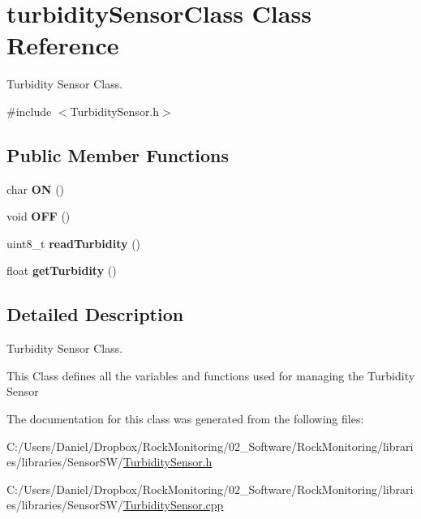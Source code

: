 \hypertarget{classturbidity_sensor_class}{}\section{turbidity\+Sensor\+Class Class Reference}
\label{classturbidity_sensor_class}


Turbidity Sensor Class.  




{\ttfamily \#include $<$Turbidity\+Sensor.\+h$>$}

\subsection*{Public Member Functions}
\begin{DoxyCompactItemize}
\item 
char {\bfseries ON} ()\hypertarget{classturbidity_sensor_class_a6c29788f29e2a5abef2773d8c6f7e779}{}\label{classturbidity_sensor_class_a6c29788f29e2a5abef2773d8c6f7e779}

\item 
void {\bfseries O\+FF} ()\hypertarget{classturbidity_sensor_class_ab3c44920d97b9f56c90e8b92b42458aa}{}\label{classturbidity_sensor_class_ab3c44920d97b9f56c90e8b92b42458aa}

\item 
uint8\+\_\+t {\bfseries read\+Turbidity} ()\hypertarget{classturbidity_sensor_class_a9b98524f56cc8042bffa4ef5348ea905}{}\label{classturbidity_sensor_class_a9b98524f56cc8042bffa4ef5348ea905}

\item 
float {\bfseries get\+Turbidity} ()\hypertarget{classturbidity_sensor_class_a467fd54cc36581815c6c0f6c69b28705}{}\label{classturbidity_sensor_class_a467fd54cc36581815c6c0f6c69b28705}

\end{DoxyCompactItemize}


\subsection{Detailed Description}
Turbidity Sensor Class. 

This Class defines all the variables and functions used for managing the Turbidity Sensor 

The documentation for this class was generated from the following files\+:\begin{DoxyCompactItemize}
\item 
C\+:/\+Users/\+Daniel/\+Dropbox/\+Rock\+Monitoring/02\+\_\+\+Software/\+Rock\+Monitoring/libraries/libraries/\+Sensor\+S\+W/\hyperlink{_turbidity_sensor_8h}{Turbidity\+Sensor.\+h}\item 
C\+:/\+Users/\+Daniel/\+Dropbox/\+Rock\+Monitoring/02\+\_\+\+Software/\+Rock\+Monitoring/libraries/libraries/\+Sensor\+S\+W/\hyperlink{_turbidity_sensor_8cpp}{Turbidity\+Sensor.\+cpp}\end{DoxyCompactItemize}
